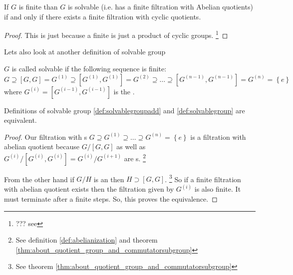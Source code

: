 \begin{property}
  If $G$ is finite than $G$ is solvable (i.e. has a finite filtration with
  Abelian quotients) if and only if there exists a
  finite filtration with cyclic quotients.
  \begin{proof}
    This is just because a finite  is just a
    product of cyclic groups.
    \footnote{
      ??? see 
    }
  \end{proof}
  \label{property:lec8_solvable4}
\end{property}

Lets also look at another definition of solvable group
\begin{definition}
  $G$ is called solvable if the following sequence is finite:
  \[
  G
  \supseteq \left[G, G\right] = G^{(1)}
  \supseteq \left[G^{(1)}, G^{(1)}\right] = G^{(2)}
  \supseteq \dots \supseteq
  \left[G^{(n-1)}, G^{(n-1)}\right] = G^{(n)} = \left\{e\right\}
  \]
  where $G^{(i)} = \left[G^{(i-1)}, G^{(i-1)}\right]$ is the
  .
  \label{def:solvablegroupadd}
\end{definition}

\begin{remark}
  Definitions of solvable group \ref{def:solvablegroupadd} and
  \ref{def:solvablegroup} are equivalent.
  \begin{proof}
    Our filtration with s
    $G \supseteq G^{(1)} \supseteq \dots \supseteq G^{(n)} =
    \left\{e\right\}$
    is a filtration with abelian quotient because
    $G/\left[G, G\right]$ as well as 
    $G^{(i)}/\left[G^{(i)}, G^{(i)}\right] = G^{(i)}/G^{(i+1)}$ are
    s.
    \footnote{
      See definition \ref{def:abelianization} and theorem
      \ref{thm:about_quotient_group_and_commutatorsubgroup}
    }

    From the other hand if $G/H$ is an  then
    $H \supset \left[G, G\right]$.
    \footnote{
      See theorem \ref{thm:about_quotient_group_and_commutatorsubgroup}
    }
    So if a finite filtration with
    abelian quotient exists then the filtration given by $G^{(i)}$ is
    also finite. It must terminate after a finite steps. So, this
    proves the equivalence.  
  \end{proof}
  \label{rem:lec8_solvable}
\end{remark}


